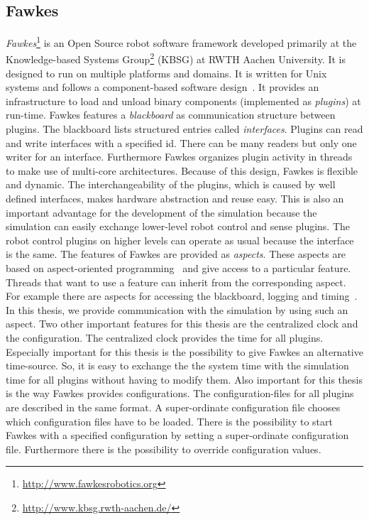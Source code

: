 \subsection{Fawkes}
\textit{Fawkes}\footnote{\url{http://www.fawkesrobotics.org}} is an Open Source robot software framework developed primarily at the Knowledge-based Systems Group\footnote{\url{http://www.kbsg.rwth-aachen.de/}} (KBSG) at RWTH Aachen University. It is designed to run on multiple platforms and domains. It is written for Unix systems and follows a component-based software design~\cite{FawkesDesign}. It provides an infrastructure to load and unload binary components (implemented as \textit{plugins}) at run-time. Fawkes features a \textit{blackboard} as communication structure between plugins. The blackboard lists structured entries called \textit{interfaces}. Plugins can read and write interfaces with a specified id. There can be many readers but only one writer for an interface. Furthermore Fawkes organizes plugin activity in threads to make use of multi-core architectures. Because of this design, Fawkes is flexible and dynamic. The interchangeability of the plugins, which is caused by well defined interfaces, makes hardware abstraction and reuse easy. This is also an important advantage for the development of the simulation because the simulation can easily exchange lower-level robot control and sense plugins. The robot control plugins on higher levels can operate as usual because the interface is the same. The features of Fawkes are provided as \textit{aspects}. These aspects are based on aspect-oriented programming~\cite{aspect_oriented} and give access to a particular feature. Threads that want to use a feature can inherit from the corresponding aspect. For example there are aspects for accessing the blackboard, logging and timing~\cite{tnthesis}. In this thesis, we provide communication with the simulation by using such an aspect. Two other important features for this thesis are the centralized clock and the configuration. The centralized clock provides the time for all plugins. Especially important for this thesis is the possibility to give Fawkes an alternative time-source. So, it is easy to exchange the the system time with the simulation time for all plugins without having to modify them. Also important for this thesis is the way Fawkes provides configurations. The configuration-files for all plugins are described in the same format. A super-ordinate configuration file chooses which configuration files have to be loaded. There is the possibility to start Fawkes with a specified configuration by setting a super-ordinate configuration file. Furthermore there is the possibility to override configuration values.\\
